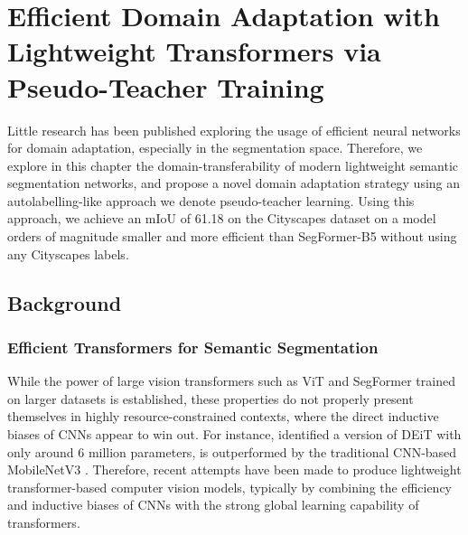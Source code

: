 \documentclass[a4paper,12pt]{report}
\begin{document}

\chapter{Efficient Domain Adaptation with Lightweight Transformers via Pseudo-Teacher Training}

Little research has been published exploring the usage of efficient neural networks for domain adaptation, especially in the segmentation space. Therefore, we explore in this chapter the domain-transferability of modern lightweight semantic segmentation networks, and propose a novel domain adaptation strategy using an autolabelling-like approach we denote pseudo-teacher learning. Using this approach, we achieve an mIoU of 61.18 on the Cityscapes dataset on a model orders of magnitude smaller and more efficient than SegFormer-B5 without using any Cityscapes labels.

\section{Background}

\subsection{Efficient Transformers for Semantic Segmentation}

While the power of large vision transformers such as ViT and SegFormer trained on larger datasets is established, these properties do not properly present themselves in highly resource-constrained contexts, where the direct inductive biases of CNNs appear to win out. For instance, \cite{mehta_mobilevit_2022} identified a version of DEiT \cite{touvron_training_2021} with only around 6 million parameters, is outperformed by the traditional CNN-based MobileNetV3 \cite{howard_searching_2019}. Therefore, recent attempts have been made to produce lightweight transformer-based computer vision models, typically by combining the efficiency and inductive biases of CNNs with the strong global learning capability of transformers.
\end{document}
